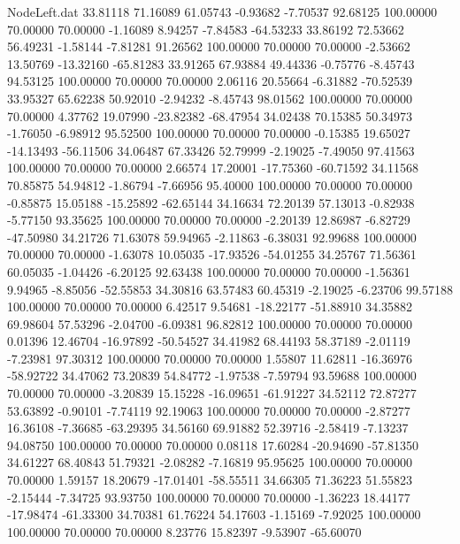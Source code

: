 \begin{filecontents}{NodeLeft.dat}
  33.81118   71.16089   61.05743    -0.93682   -7.70537   92.68125  100.00000   70.00000   70.00000   -1.16089    8.94257   -7.84583  -64.53233
  33.86192   72.53662   56.49231    -1.58144   -7.81281   91.26562  100.00000   70.00000   70.00000   -2.53662   13.50769  -13.32160  -65.81283
  33.91265   67.93884   49.44336    -0.75776   -8.45743   94.53125  100.00000   70.00000   70.00000    2.06116   20.55664   -6.31882  -70.52539
  33.95327   65.62238   50.92010    -2.94232   -8.45743   98.01562  100.00000   70.00000   70.00000    4.37762   19.07990  -23.82382  -68.47954
  34.02438   70.15385   50.34973    -1.76050   -6.98912   95.52500  100.00000   70.00000   70.00000   -0.15385   19.65027  -14.13493  -56.11506
  34.06487   67.33426   52.79999    -2.19025   -7.49050   97.41563  100.00000   70.00000   70.00000    2.66574   17.20001  -17.75360  -60.71592
  34.11568   70.85875   54.94812    -1.86794   -7.66956   95.40000  100.00000   70.00000   70.00000   -0.85875   15.05188  -15.25892  -62.65144
  34.16634   72.20139   57.13013    -0.82938   -5.77150   93.35625  100.00000   70.00000   70.00000   -2.20139   12.86987   -6.82729  -47.50980
  34.21726   71.63078   59.94965    -2.11863   -6.38031   92.99688  100.00000   70.00000   70.00000   -1.63078   10.05035  -17.93526  -54.01255
  34.25767   71.56361   60.05035    -1.04426   -6.20125   92.63438  100.00000   70.00000   70.00000   -1.56361    9.94965   -8.85056  -52.55853
  34.30816   63.57483   60.45319    -2.19025   -6.23706   99.57188  100.00000   70.00000   70.00000    6.42517    9.54681  -18.22177  -51.88910
  34.35882   69.98604   57.53296    -2.04700   -6.09381   96.82812  100.00000   70.00000   70.00000    0.01396   12.46704  -16.97892  -50.54527
  34.41982   68.44193   58.37189    -2.01119   -7.23981   97.30312  100.00000   70.00000   70.00000    1.55807   11.62811  -16.36976  -58.92722
  34.47062   73.20839   54.84772    -1.97538   -7.59794   93.59688  100.00000   70.00000   70.00000   -3.20839   15.15228  -16.09651  -61.91227
  34.52112   72.87277   53.63892    -0.90101   -7.74119   92.19063  100.00000   70.00000   70.00000   -2.87277   16.36108   -7.36685  -63.29395
  34.56160   69.91882   52.39716    -2.58419   -7.13237   94.08750  100.00000   70.00000   70.00000    0.08118   17.60284  -20.94690  -57.81350
  34.61227   68.40843   51.79321    -2.08282   -7.16819   95.95625  100.00000   70.00000   70.00000    1.59157   18.20679  -17.01401  -58.55511
  34.66305   71.36223   51.55823    -2.15444   -7.34725   93.93750  100.00000   70.00000   70.00000   -1.36223   18.44177  -17.98474  -61.33300
  34.70381   61.76224   54.17603    -1.15169   -7.92025  100.00000  100.00000   70.00000   70.00000    8.23776   15.82397   -9.53907  -65.60070

\end{filecontents}
